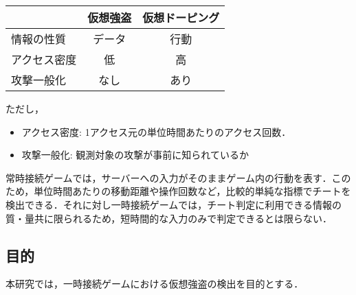 \documentclass[a4paper,11pt]{jsarticle}
\begin{document}
\begin{center}
\begin{tabular}{l|cc}
& 仮想強盗 & 仮想ドーピング \\ \hline
情報の性質 & データ & 行動 \\
アクセス密度 & 低 & 高 \\
攻撃一般化 & なし & あり \\
\end{tabular}
\end{center}

ただし，

\begin{itemize}
\item
アクセス密度: 1アクセス元の単位時間あたりのアクセス回数．
\item
攻撃一般化: 観測対象の攻撃が事前に知られているか
\end{itemize}

常時接続ゲームでは，サーバーへの入力がそのままゲーム内の行動を表す．このため，単位時間あたりの移動距離や操作回数など，比較的単純な指標でチートを検出できる\cite{botcraft}．それに対し一時接続ゲームでは，チート判定に利用できる情報の質・量共に限られるため，短時間的な入力のみで判定できるとは限らない．

\subsection{目的}
本研究では，一時接続ゲームにおける仮想強盗の検出を目的とする．
\end{document}
